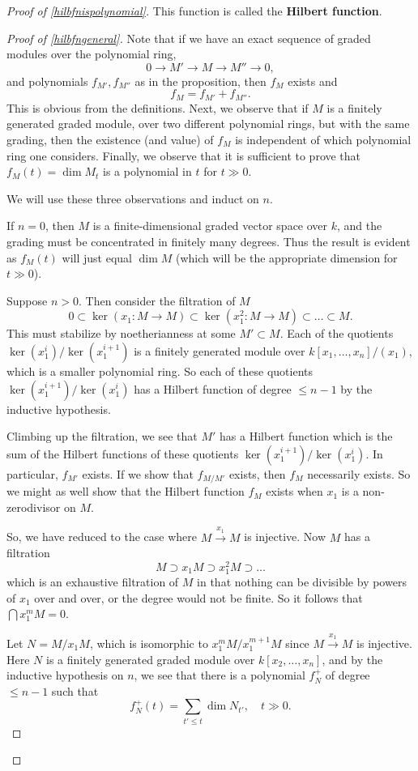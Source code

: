 \begin{proof}[Proof of  \cref{hilbfnispolynomial}]
This function is called the \textbf{Hilbert function}.

\begin{proof}[Proof of \cref{hilbfngeneral}]
Note that if we have an exact sequence of graded modules over the polynomial
ring,
\[ 0 \to M' \to M \to M'' \to 0,   \]
and polynomials $f_{M'}, f_{M''}$ as in the proposition, then $f_M$ exists and 
\[ f_M = f_{M'} + f_{M''}.  \] This is obvious from the definitions.
Next, we observe that if $M$ is a finitely generated graded module, over two
different polynomial rings, but with the same grading, then the existence (and
value) of $f_M$ is independent of which polynomial ring one considers.
Finally, we observe that it is sufficient to prove that $f_M(t) = \dim M_t$ is a
polynomial in $t$ for $t \gg 0$.

We will
use these three observations and induct on $n$.

If $n  = 0$, then $M$ is a finite-dimensional graded vector space over
$k$, and the grading must be concentrated in finitely many degrees. Thus
the result is evident as $f_{M}(t)$ will just equal $\dim M$ (which will be the
appropriate dimension for $t \gg 0$). 

Suppose $n > 0$.  Then
consider the filtration of $M$
\[ 0 \subset \ker( x_1: M \to M) \subset \ker (x_1^2: M \to M) \subset \dots
\subset M.  \]
This must stabilize by noetherianness at some $M' \subset M$. Each of the
quotients $\ker( x_1^i)/\ker (x_1^{i+1})$ is a finitely generated module over
$k[x_1, \dots,
x_n]/(x_1)$, which is a smaller polynomial ring.  So each of these quotients
$\ker (x_1^{i+1})/\ker (x_1^{i})$ has a Hilbert function of degree $\leq n-1$ by
the inductive hypothesis. 

Climbing up the filtration, we see that  $M'$ has a Hilbert function which is the sum of the Hilbert functions of
these quotients $\ker(x_1^{i+1})/\ker(x_1^{i})$. In particular, $f_{M'}$ exists. If we show that $f_{M/M'}$
exists, then $f_M$ necessarily exists. So we might as well show that the
Hilbert function $f_M$ exists when $x_1$ is  a non-zerodivisor on $M$. 

So, we have reduced to the case where $M \stackrel{x_1}{\to} M$
is injective.
Now $M$ has a filtration
\[ M \supset x_1 M \supset x_1^2 M \supset \dots  \]
which is an exhaustive filtration of $M$ in that nothing can be divisible by
powers of $x_1$ over and over, or the degree would not be finite. So it
follows that  $\bigcap x_1^m M = 0$. 

Let $N = M/x_1 M $, which is isomorphic to $ x_1^m M/x_1^{m+1} M$ since $M \stackrel{x_1}{\to} M$ is
injective. Here $N$ is a finitely generated graded module over $k[x_2, \dots, x_n]$, and by the
inductive hypothesis on $n$, we see that there is a polynomial $f_N^+$ of degree $\leq n-1$ such that
\[ f_N^+(t) = \sum_{t' \leq t} \dim N_{t'}, \quad t \gg 0.  \]


\end{proof}
\end{proof}
